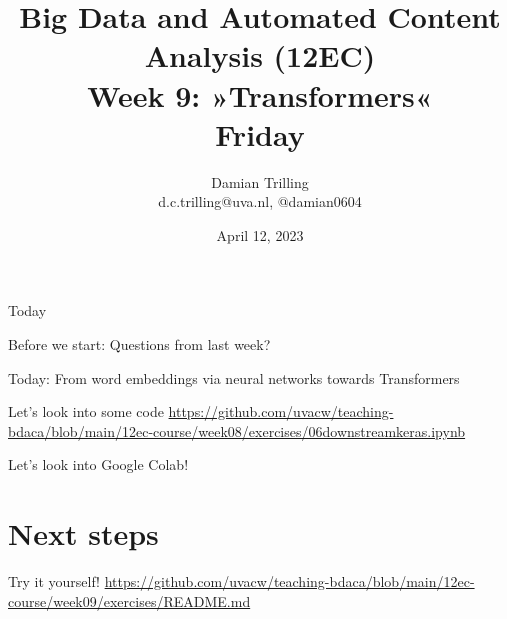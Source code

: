 

\graphicspath{{../../resources/img/}}




\title[Big Data and Automated Content Analysis]{\textbf{Big Data and Automated Content Analysis (12EC)} 
\\Week 9: »Transformers«
\\Friday}
\author[Damian Trilling]{Damian Trilling\\ \footnotesize{d.c.trilling@uva.nl, @damian0604 \\}}
\date{April 12, 2023}


\begin{frame}{}
	\titlepage
\end{frame}

\begin{frame}{Today}
	\tableofcontents
\end{frame}
\begin{frame}[standout]
Before we start: Questions from last week?
\end{frame}


\begin{frame}[standout]
Today: From word embeddings via neural networks towards Transformers
\end{frame}




\begin{frame}{Let's look into some code}
\url{https://github.com/uvacw/teaching-bdaca/blob/main/12ec-course/week08/exercises/06downstreamkeras.ipynb}
\end{frame}




\begin{frame}[standout]
Let's look into Google Colab!
\end{frame}


\section{Next steps}
\begin{frame}[standout]
Try it yourself!
\url{https://github.com/uvacw/teaching-bdaca/blob/main/12ec-course/week09/exercises/README.md}
\end{frame}


\begin{frame}
\printbibliography
\end{frame}




